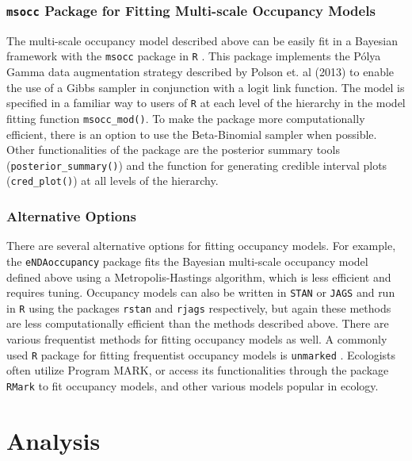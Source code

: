 \documentclass[12pt]{article}\usepackage[]{graphicx}\usepackage[]{color}
\begin{document}
\subsubsection{\texttt{msocc} Package for Fitting Multi-scale Occupancy Models}

The multi-scale occupancy model described above \cite{Dorazio_Erickson} can be easily fit in a Bayesian framework with the \texttt{msocc} package in \texttt{R} \cite{Stratton}. This package implements the P\'{o}lya Gamma data augmentation strategy described by Polson et. al (2013) to enable the use of a Gibbs sampler in conjunction with a logit link function. The model is specified in a familiar way to users of \texttt{R} at each level of the hierarchy in the model fitting function \texttt{msocc\_mod()}. To make the package more computationally efficient, there is an option to use the Beta-Binomial sampler when possible. Other functionalities of the package are the posterior summary tools (\texttt{posterior\_summary()}) and the function for generating credible interval plots (\texttt{cred\_plot()}) at all levels of the hierarchy. 

\subsubsection{Alternative Options}

There are several alternative options for fitting occupancy models. For example, the \texttt{eNDAoccupancy} \cite{Dorazio_Erickson} package fits the Bayesian multi-scale occupancy model defined above using a Metropolis-Hastings algorithm, which is less efficient and requires tuning. Occupancy models can also be written in \texttt{STAN} or \texttt{JAGS} and run in \texttt{R} using the packages \texttt{rstan} \cite{rstan} and \texttt{rjags} \cite{rjags} respectively, but again these methods are less computationally efficient than the methods described above. There are various frequentist methods for fitting occupancy models as well. A commonly used \texttt{R} package for fitting frequentist occupancy models is \texttt{unmarked} \cite{unmarked}. Ecologists often utilize Program MARK, or access its functionalities through the  package \texttt{RMark} \cite{RMark} to fit occupancy models, and other various models popular in ecology.

\section{Analysis}
\end{document}
